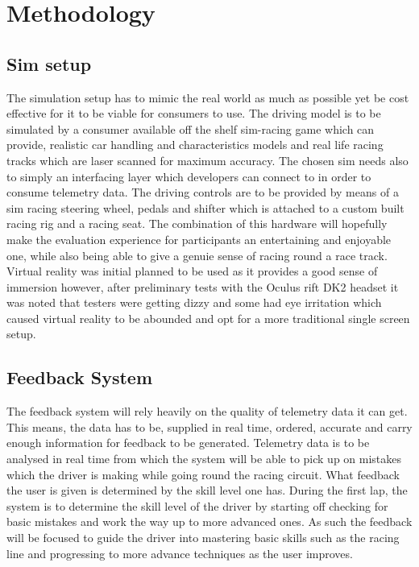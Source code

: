 \section{Methodology}

\subsection{Sim setup}
	The simulation setup has to mimic the real world as much as possible yet be cost effective for it to be viable for consumers to use. The driving model is to be simulated by a consumer available off the shelf sim-racing game which can provide, realistic car handling and characteristics  models and real life racing tracks which are laser scanned for maximum accuracy. The chosen sim needs also to simply an interfacing layer which developers can connect to in order to consume telemetry data. The driving controls are to be provided by means of a sim racing steering wheel, pedals and shifter which is attached to a custom built racing rig and a racing seat. The combination of this hardware will hopefully make the evaluation experience for participants an entertaining and enjoyable one, while also being able to give a genuie sense of racing round a race track. Virtual reality was initial planned to be used as it provides a good sense of immersion  however, after preliminary tests with the Oculus rift DK2 headset it was noted that testers were getting dizzy and some had eye irritation which caused virtual reality to be abounded and opt for a more traditional single screen setup.

\subsection{Feedback System}
	The feedback system will rely heavily on the quality of telemetry data it can get. This means, the data has to be, supplied in real time, ordered, accurate and carry enough information for feedback to be generated. Telemetry data is to be analysed in real time from which the system will be able to pick up on mistakes which the driver is making while going round the racing circuit. What feedback the user is given is determined by the skill level one has. During the first lap, the system is to determine the skill level of the driver by starting off checking for basic mistakes and work the way up to more advanced ones. As such the feedback will be focused to guide the driver into mastering basic skills such as the racing line and progressing to more advance techniques as the user improves.

